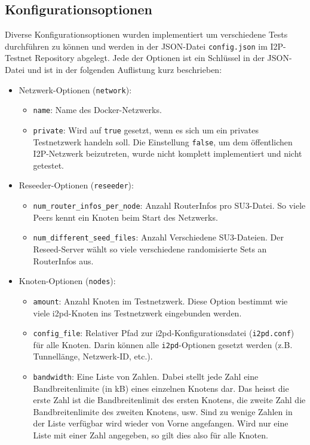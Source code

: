 \subsection{Konfigurationsoptionen}\label{sec:konfigurationsoptionen}

Diverse Konfigurationsoptionen wurden implementiert um verschiedene Tests durchführen zu können und werden in der JSON-Datei \lstinline|config.json| im I2P-Testnet Repository abgelegt.
Jede der Optionen ist ein Schlüssel in der JSON-Datei und ist in der folgenden Auflistung kurz beschrieben:

\begin{itemize}
    \item Netzwerk-Optionen (\lstinline|network|):
        \begin{itemize}
        \item \lstinline|name|: Name des Docker-Netzwerks.
        \item \lstinline|private|: Wird auf \lstinline|true| gesetzt, wenn es sich um ein privates Testnetzwerk handeln soll. Die Einstellung \lstinline|false|, um dem öffentlichen I2P-Netzwerk beizutreten, wurde nicht komplett implementiert und nicht getestet.
        \end{itemize}
    \item Reseeder-Optionen (\lstinline|reseeder|):
        \begin{itemize}
        \item \lstinline|num_router_infos_per_node|: Anzahl RouterInfos pro SU3-Datei. So viele Peers kennt ein Knoten beim Start des Netzwerks.
        \item \lstinline|num_different_seed_files|: Anzahl Verschiedene SU3-Dateien. Der Reseed-Server wählt so viele verschiedene randomisierte Sets an RouterInfos aus.
        \end{itemize}
    \item Knoten-Optionen (\lstinline|nodes|):
        \begin{itemize}
        \item \lstinline|amount|: Anzahl Knoten im Testnetzwerk. Diese Option bestimmt wie viele i2pd-Knoten ins Testnetzwerk eingebunden werden.
        \item \lstinline|config_file|: Relativer Pfad zur i2pd-Konfigurationsdatei (\lstinline|i2pd.conf|) für alle Knoten. Darin können alle \lstinline|i2pd|-Optionen gesetzt werden (z.B. Tunnellänge, Netzwerk-ID, etc.).
        \item \lstinline|bandwidth|: Eine Liste von Zahlen. Dabei stellt jede Zahl eine Bandbreitenlimite (in kB) eines einzelnen Knotens dar. Das heisst die erste Zahl ist die Bandbreitenlimit des ersten Knotens, die zweite Zahl die Bandbreitenlimite des zweiten Knotens, usw. Sind zu wenige Zahlen in der Liste verfügbar wird wieder von Vorne angefangen. Wird nur eine Liste mit einer Zahl angegeben, so gilt dies also für alle Knoten.

\end{itemize}
\end{itemize}
